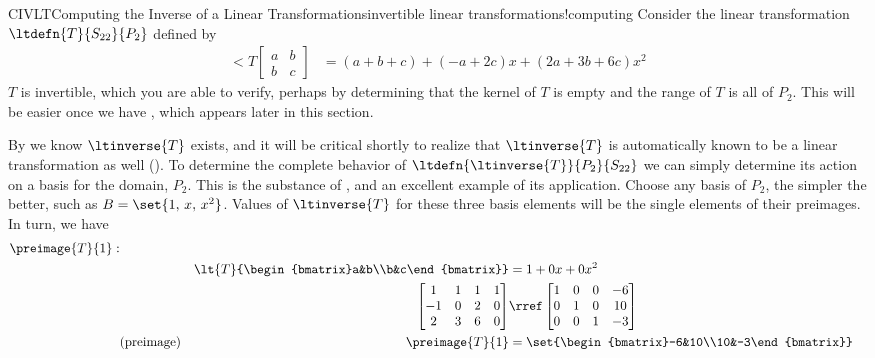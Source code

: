 %
\begin{example}{CIVLT}{Computing the Inverse of a Linear Transformations}{invertible linear transformations!computing}
%
Consider the linear transformation  $\ltdefn{T}{S_{22}}{P_2}$ defined by
%
\begin{align*}
\lt{T}{\begin{bmatrix}a&b\\b&c\end{bmatrix}}
&=
\left(a+b+c\right)
+
\left(-a+2c\right)x
+
\left(2a+3b+6c\right)x^2
\end{align*}
%
$T$ is invertible, which you are able to verify, perhaps by determining that the kernel of $T$ is empty and the range of $T$ is all of $P_2$.  This will be easier once we have , which appears later in this section.\par
%
By  we know $\ltinverse{T}$ exists, and it will be critical shortly to realize that $\ltinverse{T}$ is automatically known to be a linear transformation as well ().  To determine the complete behavior of $\ltdefn{\ltinverse{T}}{P_2}{S_{22}}$ we can simply determine its action on a basis for the domain, $P_2$.  This is the substance of , and an excellent example of its application.   Choose any basis of $P_2$, the simpler the better, such as $B=\set{1,\,x,\,x^2}$.  Values of $\ltinverse{T}$ for these three basis elements will be the single elements of their preimages.  In turn, we have
%
\begin{align*}
\preimage{T}{1}:&\\
&&\lt{T}{\begin{bmatrix}a&b\\b&c\end{bmatrix}}
&=1+0x+0x^2\\
%
&&\begin{bmatrix}
 1 & 1 & 1 & 1\\
 -1 & 0 & 2 & 0\\
 2 & 3 & 6 & 0
\end{bmatrix}
&\rref
\begin{bmatrix}
1 & 0 & 0& -6 \\
0 & 1 & 0& 10 \\
0 & 0 & 1& -3
\end{bmatrix}
\\
&\text{(preimage)}&\preimage{T}{1}
&=\set{\begin{bmatrix}-6&10\\10&-3\end{bmatrix}}\\

\end{align*}
\end{example}
